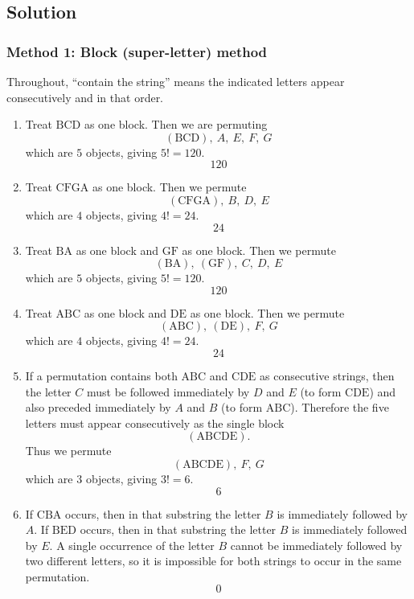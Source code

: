 \documentclass[12pt]{article}
\begin{document}
\subsection{Solution}

\subsubsection{Method 1: Block (super-letter) method}
Throughout, ``contain the string'' means the indicated letters appear consecutively and in that order.

\begin{enumerate}[label=(\alph*)]
\item Treat $\text{BCD}$ as one block. Then we are permuting
\[
(\text{BCD}),\ A,\ E,\ F,\ G
\]
which are $5$ objects, giving $5!=120$.
\[
\boxed{120}
\]

\item Treat $\text{CFGA}$ as one block. Then we permute
\[
(\text{CFGA}),\ B,\ D,\ E
\]
which are $4$ objects, giving $4!=24$.
\[
\boxed{24}
\]

\item Treat $\text{BA}$ as one block and $\text{GF}$ as one block. Then we permute
\[
(\text{BA}),\ (\text{GF}),\ C,\ D,\ E
\]
which are $5$ objects, giving $5!=120$.
\[
\boxed{120}
\]

\item Treat $\text{ABC}$ as one block and $\text{DE}$ as one block. Then we permute
\[
(\text{ABC}),\ (\text{DE}),\ F,\ G
\]
which are $4$ objects, giving $4!=24$.
\[
\boxed{24}
\]

\item If a permutation contains both $\text{ABC}$ and $\text{CDE}$ as consecutive strings, then the letter $C$ must be followed immediately by $D$ and $E$ (to form $\text{CDE}$) and also preceded immediately by $A$ and $B$ (to form $\text{ABC}$). Therefore the five letters must appear consecutively as the single block
\[
(\text{ABCDE}).
\]
Thus we permute
\[
(\text{ABCDE}),\ F,\ G
\]
which are $3$ objects, giving $3!=6$.
\[
\boxed{6}
\]

\item If $\text{CBA}$ occurs, then in that substring the letter $B$ is immediately followed by $A$. If $\text{BED}$ occurs, then in that substring the letter $B$ is immediately followed by $E$. A single occurrence of the letter $B$ cannot be immediately followed by two different letters, so it is impossible for both strings to occur in the same permutation.
\[
\boxed{0}
\]
\end{enumerate}
\end{document}
